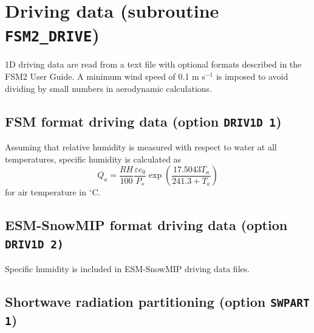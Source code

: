 \documentclass[fleqn]{article}
\begin{document}
\section{Driving data (subroutine {\tt FSM2\_DRIVE})}

1D driving data are read from a text file with optional formats described in the FSM2 User Guide. A minimum wind speed of 0.1 m s$^{-1}$ is imposed to avoid dividing by small numbers in aerodynamic calculations.

\subsection{FSM format driving data (option {\tt DRIV1D 1})}

Assuming that relative humidity is measured with respect to water at all temperatures, specific humidity is calculated as
\begin{equation}
Q_a = \frac{RH}{100}\frac{\varepsilon e_0}{P_s}\exp\left(\frac{17.5043T_a}{241.3 + T_a}\right)
\end{equation}
for air temperature in $^\circ$C.

\subsection{ESM-SnowMIP format driving data (option {\tt DRIV1D 2)}}

Specific humidity is included in ESM-SnowMIP driving data files.


\subsection{Shortwave radiation partitioning (option {\tt SWPART 1})}
\end{document}
